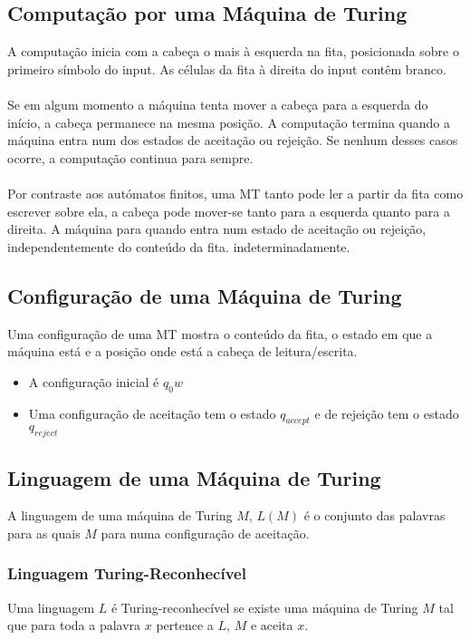 \documentclass[10pt,a4paper]{report}
\begin{document}
\subsection{Computação por uma Máquina de Turing}
A computação inicia com a cabeça o mais à esquerda na fita, posicionada sobre o primeiro símbolo do input.
As células da fita à direita do input contêm branco.\\
\\
Se em algum momento a máquina tenta mover a cabeça para a esquerda do início, a cabeça permanece na mesma posição.
A computação termina quando a máquina entra num dos estados de aceitação ou rejeição. Se nenhum desses casos ocorre, a computação continua para sempre.\\
\\
Por contraste aos autómatos finitos, uma MT tanto pode ler a partir da fita como escrever sobre ela, a cabeça pode mover-se tanto para a esquerda quanto para a direita.
A máquina para quando entra num estado de aceitação ou rejeição, independentemente do
conteúdo da fita. indeterminadamente.
\subsection{Configuração de uma Máquina de Turing}
Uma configuração de uma MT mostra o conteúdo da fita, o estado em que a máquina está e a posição onde está a cabeça de leitura/escrita.
\begin{itemize}
\item A configuração inicial é $q_0w$
\item Uma configuração de aceitação tem o estado $q_{accept}$ e de rejeição tem o estado $q_{reject}$
\end{itemize}
\subsection{Linguagem de uma Máquina de Turing}
A linguagem de uma máquina de Turing $M$, $L(M)$ é o conjunto das palavras para as quais $M$ para numa configuração de aceitação.
\subsubsection{Linguagem Turing-Reconhecível}
Uma linguagem $L$ é Turing-reconhecível se existe uma máquina de Turing $M$ tal que para toda a palavra $x$ pertence a $L$, $M$ e aceita $x$.
\end{document}
